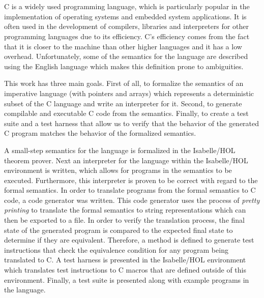 \chapter{\abstractname}

C is a widely used programming language, which is particularly popular in the implementation of operating systems and embedded system applications.
It is often used in the development of compilers, libraries and interpreters for other programming languages due to its efficiency.
C's efficiency comes from the fact that it is closer to the machine than other higher languages and it has a low overhead.
Unfortunately, some of the semantics for the language are described using the English language which makes this definition prone to ambiguities.

This work has three main goals.
First of all, to formalize the semantics of an imperative language (with pointers and arrays) which represents a deterministic subset of the C language and write an interpreter for it.
Second, to generate compilable and executable C code from the semantics.
Finally, to create a test suite and a test harness that allow us to verify that the behavior of the generated C program matches the behavior of the formalized semantics.

A small-step semantics for the language is formalized in the Isabelle/HOL theorem prover.
Next an interpreter for the language within the Isabelle/HOL environment is written, which allows for programs in the semantics to be executed.
Furthermore, this interpreter is proven to be correct with regard to the formal semantics.
In order to translate programs from the formal semantics to C code, a code generator was written.
This code generator uses the process of \textit{pretty printing} to translate the formal semantics to string representations which can then be exported to a file.
In order to verify the translation process, the final state of the generated program is compared to the expected final state to determine if they are equivalent.
Therefore, a method is defined to generate test instructions that check the equivalence condition for any program being translated to C.
A test harness is presented in the Isabelle/HOL environment which translates test instructions to C macros that are defined outside of this environment.
Finally, a test suite is presented along with example programs in the language.